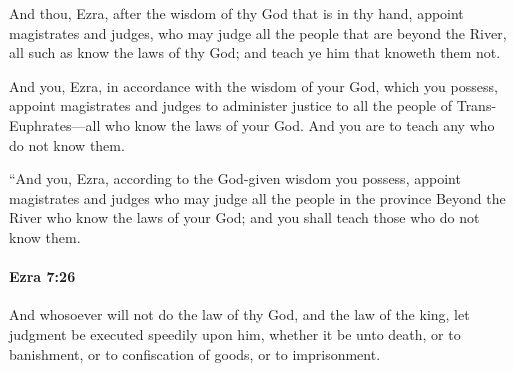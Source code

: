 			\begin{versebox}
					\item[BHS] 
					\item[LXX] 
					\item[ASV] And thou, Ezra, after the wisdom of thy God that is in thy hand, appoint magistrates and judges, who may judge all the people that are beyond the River, all such as know the laws of thy God; and teach ye him that knoweth them not.
					\item[NIV] And you, Ezra, in accordance with the wisdom of your God, which you possess, appoint magistrates and judges to administer justice to all the people of Trans-Euphrates—all who know the laws of your God. And you are to teach any who do not know them.
					\item[NRSV] “And you, Ezra, according to the God-given wisdom you possess, appoint magistrates and judges who may judge all the people in the province Beyond the River who know the laws of your God; and you shall teach those who do not know them.
			\end{versebox}

		\paragraph{Ezra 7:26} %
			\label{EZRA-7-26}

			And whosoever will not do the law of thy God, and the law of the king, let judgment be executed speedily upon him, whether it be unto death, or to banishment, or to confiscation of goods, or to imprisonment.

